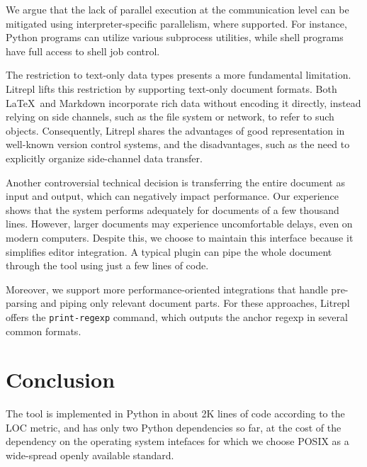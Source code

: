 \documentclass[letterpaper,12pt,twocolumn]{article}
\newcommand{\Latex}{\LaTeX\ }
\begin{document}
We argue that the lack of parallel execution at the communication level can be
mitigated using interpreter-specific parallelism, where supported. For instance,
Python programs can utilize various subprocess utilities, while shell programs
have full access to shell job control.

The restriction to text-only data types presents a more fundamental limitation.
Litrepl lifts this restriction by supporting text-only document formats. Both
\Latex and Markdown incorporate rich data without encoding it directly, instead
relying on side channels, such as the file system or network, to refer to such
objects. Consequently, Litrepl shares the advantages of good representation in
well-known version control systems, and the disadvantages, such as the need to
explicitly organize side-channel data transfer.

Another controversial technical decision is transferring the entire document as
input and output, which can negatively impact performance. Our experience shows
that the system performs adequately for documents of a few thousand lines.
However, larger documents may experience uncomfortable delays, even on modern
computers. Despite this, we choose to maintain this interface because it
simplifies editor integration. A typical plugin can pipe the whole document
through the tool using just a few lines of code.

Moreover, we support more performance-oriented integrations that handle
pre-parsing and piping only relevant document parts. For these approaches,
Litrepl offers the \verb|print-regexp| command, which outputs the anchor regexp
in several common formats.

\section{Conclusion}

The tool is implemented in Python in about 2K lines of code according to the LOC
metric, and has only two Python dependencies so far, at the cost of the
dependency on the operating system intefaces for which we choose POSIX as a
wide-spread openly available standard.

\printbibliography
\end{document}

